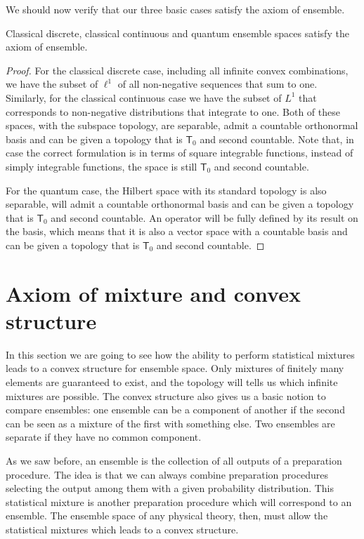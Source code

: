 We should now verify that our three basic cases satisfy the axiom of ensemble.

\begin{mathSection}
\begin{prop}
	Classical discrete, classical continuous and quantum ensemble spaces satisfy the axiom of ensemble.
\end{prop}

\begin{proof}
	For the classical discrete case, including all infinite convex combinations, we have the subset of $\ell^1$ of all non-negative sequences that sum to one. Similarly, for the classical continuous case we have the subset of $L^1$ that corresponds to non-negative distributions that integrate to one. Both of these spaces, with the subspace topology, are separable, admit a countable orthonormal basis and can be given a topology that is $\textsf{T}_0$ and second countable. Note that, in case the correct formulation is in terms of square integrable functions, instead of simply integrable functions, the space is still $\textsf{T}_0$ and second countable.
	
	For the quantum case, the Hilbert space with its standard topology is also separable, will admit a countable orthonormal basis and can be given a topology that is $\textsf{T}_0$ and second countable. An operator will be fully defined by its result on the basis, which means that it is also a vector space with a countable basis and can be given a topology that is $\textsf{T}_0$ and second countable.
\end{proof}
\end{mathSection}

\section{Axiom of mixture and convex structure}

In this section we are going to see how the ability to perform statistical mixtures leads to a convex structure for ensemble space. Only mixtures of finitely many elements are guaranteed to exist, and the topology will tells us which infinite mixtures are possible. The convex structure also gives us a basic notion to compare ensembles: one ensemble can be a component of another if the second can be seen as a mixture of the first with something else. Two ensembles are separate if they have no common component.

As we saw before, an ensemble is the collection of all outputs of a preparation procedure. The idea is that we can always combine preparation procedures selecting the output among them with a given probability distribution. This statistical mixture is another preparation procedure which will correspond to an ensemble. The ensemble space of any physical theory, then, must allow the statistical mixtures which leads to a convex structure.

